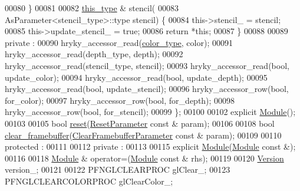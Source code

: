\begin{DoxyCode}
00080         \}
00081         
00082         \hyperlink{structhryky_1_1opengl_1_1_module_1_1_clear_framebuffer_parameter}{this_type} & stencil(
00083             AsParameter<stencil\_type>::type stencil) \{
00084             this->stencil\_ = stencil;
00085             this->update\_stencil\_ = \textcolor{keyword}{true};
00086             \textcolor{keywordflow}{return} *\textcolor{keyword}{this};
00087         \}
00088         
00089     \textcolor{keyword}{private} :
00090         hryky\_accessor\_read(\hyperlink{classhryky_1_1color_1_1_rgba}{color_type},     color);
00091         hryky\_accessor\_read(depth\_type,     depth);
00092         hryky\_accessor\_read(stencil\_type,   stencil);
00093         hryky\_accessor\_read(\textcolor{keywordtype}{bool},           update\_color);
00094         hryky\_accessor\_read(\textcolor{keywordtype}{bool},           update\_depth);
00095         hryky\_accessor\_read(\textcolor{keywordtype}{bool},           update\_stencil);
00096         hryky\_accessor\_row(\textcolor{keywordtype}{bool},            for\_color);
00097         hryky\_accessor\_row(\textcolor{keywordtype}{bool},            for\_depth);
00098         hryky\_accessor\_row(\textcolor{keywordtype}{bool},            for\_stencil);
00099     \};
00100 
00102     \textcolor{keyword}{explicit} \hyperlink{classhryky_1_1opengl_1_1_module_a905e43365bbc4a79d8e8c3e3df9d70fe}{Module}();
00103 
00105     \textcolor{keywordtype}{bool} \hyperlink{classhryky_1_1opengl_1_1_module_af09eb5e4e4a6e8f89efdc7b97a220556}{reset}(\hyperlink{structhryky_1_1opengl_1_1_module_1_1_reset_parameter}{ResetParameter} \textcolor{keyword}{const} & param);
00106 
00108     \textcolor{keywordtype}{bool} \hyperlink{classhryky_1_1opengl_1_1_module_ae3195bd0969368a580a7b56dedb66f76}{clear_framebuffer}(\hyperlink{structhryky_1_1opengl_1_1_module_1_1_clear_framebuffer_parameter}{ClearFramebufferParameter} \textcolor{keyword}{const} & param);
00109 
00110 \textcolor{keyword}{protected} :
00111 
00112 \textcolor{keyword}{private} :
00113 
00115     \textcolor{keyword}{explicit} \hyperlink{classhryky_1_1opengl_1_1_module_a905e43365bbc4a79d8e8c3e3df9d70fe}{Module}(\hyperlink{classhryky_1_1opengl_1_1_module}{Module} \textcolor{keyword}{const} &);
00116 
00118     \hyperlink{classhryky_1_1opengl_1_1_module}{Module} & operator=(\hyperlink{classhryky_1_1opengl_1_1_module}{Module} \textcolor{keyword}{const} & rhs);
00119 
00120     \hyperlink{classhryky_1_1opengl_1_1_version}{Version}                         version\_;
00121 
00122     PFNGLCLEARPROC                  glClear\_;
00123     PFNGLCLEARCOLORPROC             glClearColor\_;

\end{DoxyCode}
